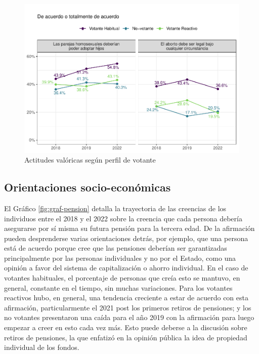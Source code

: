 \documentclass[
  12pt,
]{book}
\begin{document}
\begin{figure}

{\centering \includegraphics{reporte-elsoc_files/figure-latex/graf-op-valores-2-1} 

}

\caption{Actitudes valóricas según perfil de votante}\label{fig:graf-op-valores-2}
\end{figure}

\hypertarget{orientaciones-socio-econuxf3micas}{%
\subsection{Orientaciones socio-económicas}\label{orientaciones-socio-econuxf3micas}}

El Gráfico \ref{fig:graf-pension} detalla la trayectoria de las creencias de los individuos entre el 2018 y el 2022 sobre la creencia que cada persona debería asegurarse por sí misma su futura pensión para la tercera edad. De la afirmación pueden desprenderse varias orientaciones detrás, por ejemplo, que una persona está de acuerdo porque cree que las pensiones deberían ser garantizadas principalmente por las personas individuales y no por el Estado, como una opinión a favor del sistema de capitalización o ahorro individual. En el caso de votantes habituales, el porcentaje de personas que creía esto se mantuvo, en general, constante en el tiempo, sin muchas variaciones. Para los votantes reactivos hubo, en general, una tendencia creciente a estar de acuerdo con esta afirmación, particularmente el 2021 post los primeros retiros de pensiones; y los no votantes presentaron una caída para el año 2019 con la afirmación para luego empezar a creer en esto cada vez más. Esto puede deberse a la discusión sobre retiros de pensiones, la que enfatizó en la opinión pública la idea de propiedad individual de los fondos.
\end{document}
